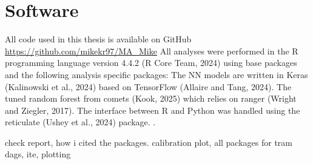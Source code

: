 



\section{Software}


All code used in this thesis is available on GitHub \url{https://github.com/mikekr97/MA_Mike} All analyses were performed in the R programming language version 4.4.2 (R Core Team, 2024) using base packages and the following analysis specific packages: The NN models are written in Keras (Kalinowski et al., 2024) based on TensorFlow (Allaire and Tang, 2024). The tuned random forest from comets (Kook, 2025) which relies on ranger (Wright and Ziegler, 2017). The interface between R and Python was handled using the reticulate (Ushey et al., 2024) package.
.


check report, how i cited the packages. calibration plot, all packages for tram dags, ite, plotting



